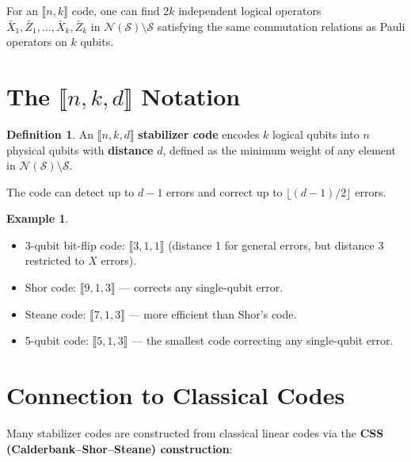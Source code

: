\documentclass[11pt]{article}
\theoremstyle{definition}
\newtheorem{definition}{Definition}[section]
\newtheorem{example}{Example}[section]
\begin{document}
For an $\llbracket n,k\rrbracket$ code, one can find $2k$ independent logical operators $\bar{X}_1,\bar{Z}_1,\dots,\bar{X}_k,\bar{Z}_k$ in $\mathcal{N}(\mathcal{S})\setminus\mathcal{S}$ satisfying the same commutation relations as Pauli operators on $k$ qubits.

\section{The $\llbracket n,k,d\rrbracket$ Notation}

\begin{definition}
An $\llbracket n,k,d\rrbracket$ \textbf{stabilizer code} encodes $k$ logical qubits into $n$ physical qubits with \textbf{distance} $d$, defined as the minimum weight of any element in $\mathcal{N}(\mathcal{S})\setminus\mathcal{S}$.

The code can detect up to $d-1$ errors and correct up to $\lfloor(d-1)/2\rfloor$ errors.
\end{definition}

\begin{example}\leavevmode
\begin{itemize}
    \item 3-qubit bit-flip code: $\llbracket 3,1,1\rrbracket$ (distance 1 for general errors, but distance 3 restricted to $X$ errors).
    \item Shor code: $\llbracket 9,1,3\rrbracket$ --- corrects any single-qubit error.
    \item Steane code: $\llbracket 7,1,3\rrbracket$ --- more efficient than Shor's code.
    \item 5-qubit code: $\llbracket 5,1,3\rrbracket$ --- the smallest code correcting any single-qubit error.
\end{itemize}
\end{example}

\section{Connection to Classical Codes}

Many stabilizer codes are constructed from classical linear codes via the \textbf{CSS (Calderbank--Shor--Steane) construction}:
\end{document}
